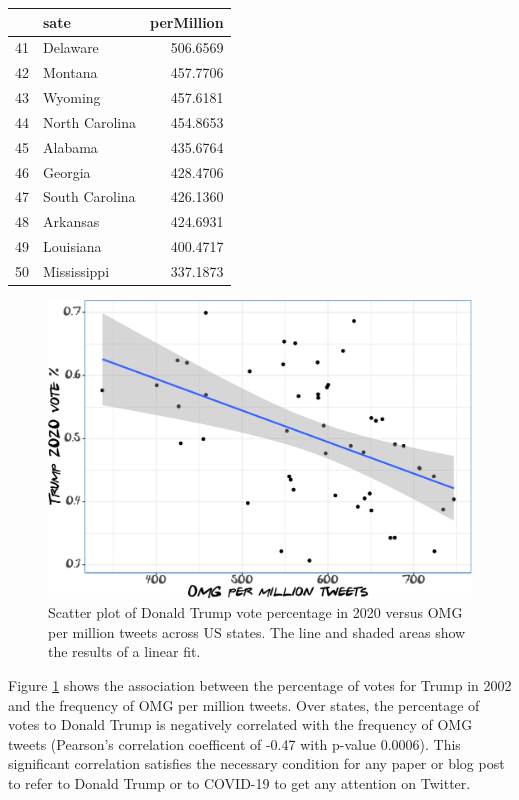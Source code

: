\documentclass[]{article}
\begin{document}
\begin{tabular}{l|l|r}
\hline
  & sate & perMillion\\
\hline
41 & Delaware & 506.6569\\
\hline
42 & Montana & 457.7706\\
\hline
43 & Wyoming & 457.6181\\
\hline
44 & North Carolina & 454.8653\\
\hline
45 & Alabama & 435.6764\\
\hline
46 & Georgia & 428.4706\\
\hline
47 & South Carolina & 426.1360\\
\hline
48 & Arkansas & 424.6931\\
\hline
49 & Louisiana & 400.4717\\
\hline
50 & Mississippi & 337.1873\\
\hline
\end{tabular}

\begin{figure}

{\centering \includegraphics{Friends_HPS_pdf_files/figure-latex/twittertrump-1} 

}

\caption{Scatter plot of Donald Trump vote percentage in 2020 versus OMG per million tweets across US states. The line and shaded areas show the results of a linear fit.}\label{fig:twittertrump}
\end{figure}

Figure \ref{fig:twittertrump} shows the association between the percentage of votes for Trump in 2002 and the frequency of OMG per million tweets.
Over states, the percentage of votes to Donald Trump is negatively correlated with the frequency of OMG tweets (Pearson's correlation coefficent of -0.47 with p-value 0.0006). This significant correlation satisfies the necessary condition for any paper or blog post to refer to Donald Trump or to COVID-19 to get any attention on Twitter.
\end{document}
